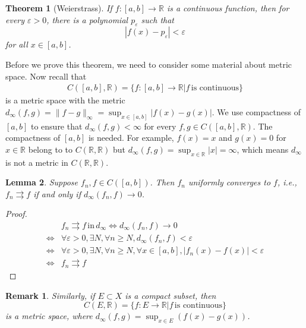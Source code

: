 \documentclass[12pt,leqno]{amsart}
\newtheorem{theorem}{Theorem}[section]
\newtheorem{lemma}[theorem]{Lemma}
\newtheorem{remark}{Remark}[section]
\theoremstyle{definition}
\numberwithin{equation}{subsection}
\begin{document}
\medskip

\begin{theorem}[Weierstrass]\label{Weierstrass_1}
If $f:[a,b]\to\mathbb{R}$ is a continuous function, then for every $\varepsilon > 0$, there is a polynomial $p_\varepsilon$ such that
$$\left|f(x) - p_\varepsilon \right| < \varepsilon$$
for all $x\in[a,b]$.
\end{theorem}

\medskip

Before we prove this theorem, we need to consider some material about metric space. Now recall that 
\begin{align*}
    C([a,b],\mathbb{R}) = \{f:[a,b]\to\mathbb{R} | f\, \text{is continuous}\}
\end{align*}
is a metric space with the metric $d_\infty(f,g) = \|f - g\|_\infty = \sup_{x\in[a,b]} |f(x) - g(x)|$. We use compactness of $[a,b]$ to ensure that $d_\infty(f,g) < \infty$ for every $f,g\in C([a,b],\mathbb{R})$. The compactness of $[a,b]$ is needed. For example, $f(x) = x$ and $g(x) = 0$ for $x\in\mathbb{R}$ belong to to $C(\mathbb{R},\mathbb{R})$ but $d_\infty(f,g) = \sup_{x\in\mathbb{R}}|x| = \infty$, which means $d_\infty$ is not a metric in $C(\mathbb{R},\mathbb{R})$.

\medskip

\begin{lemma}
Suppose $f_n,f\in C([a,b])$. Then $f_n$ uniformly converges to $f$, i.e., $f_n \rightrightarrows f$ if and only if $d_\infty(f_n,f)\to 0$.
\end{lemma}
\begin{proof}
\begin{align*}
    & f_n\rightrightarrows f\, \text{in}\, d_\infty \Leftrightarrow d_\infty(f_n,f)\to 0 \\
    \Leftrightarrow & \forall \varepsilon > 0, \exists N, \forall n\geq N, d_\infty(f_n,f) < \varepsilon \\
    \Leftrightarrow & \forall \varepsilon > 0, \exists N, \forall n\geq N, \forall x\in [a,b], \left|f_n(x) - f(x)\right| < \varepsilon \\
    \Leftrightarrow & f_n \rightrightarrows f
\end{align*}
\end{proof}

\begin{remark}
Similarly, if $E\subset X$ is a compact subset, then $$C(E,\mathbb{R}) = \{f:E\to \mathbb{R} | f\, \text{is continuous}\}$$ 
is a metric space, where $d_\infty(f,g) = \sup_{x\in E}\left(f(x)-g(x)\right)$.
\end{remark}
\end{document}
